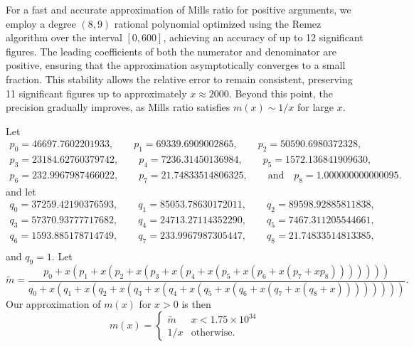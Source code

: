 For a fast and accurate approximation of Mills ratio for positive arguments, we employ a degree $\left(8,9\right)$ rational polynomial optimized using the Remez algorithm \citep{reemtsen1990modifications} over the interval $\left[0,600\right]$, achieving an accuracy of up to 12 significant figures. The leading coefficients of both the numerator and denominator are positive, ensuring that the approximation asymptotically converges to a small fraction. This stability allows the relative error to remain consistent, preserving 11  significant figures up to approximately $x\approx2000$. Beyond this point, the precision gradually improves, as Mills ratio satisfies $m(x) \sim 1/x$ for large $x$.

Let 
$$
\begin{array}{c}
p_0 = 46697.7602201933, \qquad  p_1 = 69339.6909002865, \qquad p_2 =50590.6980372328, \\
p_3 = 23184.62760379742, \qquad p_4 = 7236.31450136984, \qquad p_5 = 1572.136841909630, \\ 
p_6 = 232.9967987466022, \qquad p_7 = 21.74833514806325, \qquad \mbox{and} \quad p_8 = 1.000000000000095.
\end{array}
$$
and let
$$
\begin{array}{c}
q_0 = 37259.42190376593, \qquad q_1 = 85053.78630172011, \qquad q_2 = 89598.92885811838, \\
q_3 = 57370.93777717682, \qquad q_4 = 24713.27114352290, \qquad q_5 = 7467.311205544661, \\ 
q_6 = 1593.885178714749, \qquad q_7 = 233.9967987305447, \qquad q_8 = 21.74833514813385, \\
\end{array}
$$
and $q_{9} = 1$. Let
$$
\displaystyle \widetilde{m}  = \frac{
    p_0 + x(p_1 + x(p_2 + x( p_3 + x(p_4 + x(p_5 + x(p_6 + x(p_7 + xp_8)))))))
}{
    q_0 + x(q_1 + x(q_2 + x(q_3 + x(q_4 + x(q_5 + x(q_6 + x(q_7 + x(q_8 + x))))))))
}.
$$
Our approximation of $m(x)$ for $x>0$ is then
$$
m(x) = \left\{\begin{array}{ll}
\widetilde{m}    & \mbox{$x < 1.75 \times 10^{34}$} \\
1/x  & \mbox{otherwise.}
\end{array}\right.
$$



